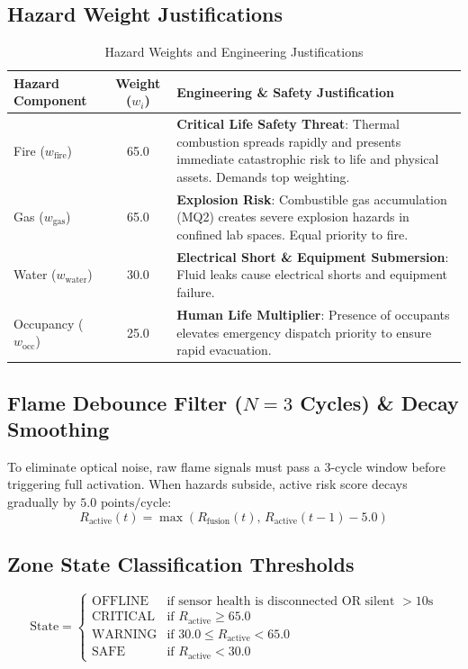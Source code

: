 \documentclass[11pt,a4paper]{article}
\begin{document}
\subsection{Hazard Weight Justifications}
\begin{table}[H]
\centering
\begin{tabularx}{\textwidth}{l c X}
\toprule
\textbf{Hazard Component} & \textbf{Weight ($w_i$)} & \textbf{Engineering \& Safety Justification} \\
\midrule
Fire ($w_{\text{fire}}$) & 65.0 & \textbf{Critical Life Safety Threat}: Thermal combustion spreads rapidly and presents immediate catastrophic risk to life and physical assets. Demands top weighting. \\
Gas ($w_{\text{gas}}$) & 65.0 & \textbf{Explosion Risk}: Combustible gas accumulation (MQ2) creates severe explosion hazards in confined lab spaces. Equal priority to fire. \\
Water ($w_{\text{water}}$) & 30.0 & \textbf{Electrical Short \& Equipment Submersion}: Fluid leaks cause electrical shorts and equipment failure. \\
Occupancy ($w_{\text{occ}}$) & 25.0 & \textbf{Human Life Multiplier}: Presence of occupants elevates emergency dispatch priority to ensure rapid evacuation. \\
\bottomrule
\end{tabularx}
\caption{Hazard Weights and Engineering Justifications}
\end{table}

\subsection{Flame Debounce Filter ($N=3$ Cycles) \& Decay Smoothing}
To eliminate optical noise, raw flame signals must pass a 3-cycle window before triggering full activation. When hazards subside, active risk score decays gradually by $5.0\text{ points/cycle}$:
\begin{equation}
R_{\text{active}}(t) = \max\left(R_{\text{fusion}}(t), \, R_{\text{active}}(t-1) - 5.0\right)
\end{equation}

\subsection{Zone State Classification Thresholds}
\begin{equation}
\text{State} = \begin{cases}
\text{OFFLINE} & \text{if sensor health is disconnected OR silent } > 10\text{s} \\
\text{CRITICAL} & \text{if } R_{\text{active}} \ge 65.0 \\
\text{WARNING} & \text{if } 30.0 \le R_{\text{active}} < 65.0 \\
\text{SAFE} & \text{if } R_{\text{active}} < 30.0
\end{cases}
\end{equation}
\end{document}
